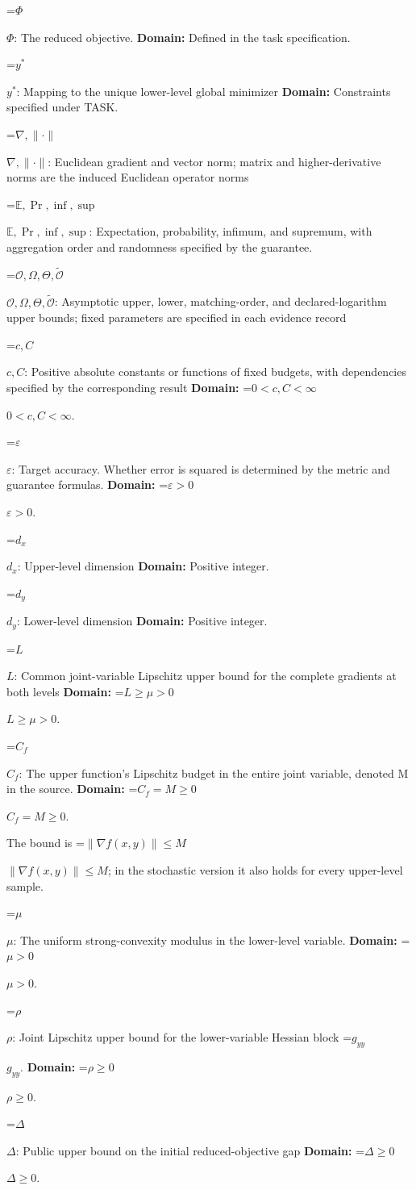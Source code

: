 \documentclass[10pt,a4paper]{article}
\newcommand{\AtlasMath}[1]{\par\begingroup\centering\setbox0=\hbox{$\displaystyle #1$}\ifdim\wd0>1.4\linewidth\typeout{ATLAS WIDE FORMULA: \the\wd0}\fi\ifdim\wd0>\linewidth\resizebox{\linewidth}{!}{\box0}\else\box0\fi\par\endgroup}
\newcommand{\AtlasInlineMath}[1]{\begingroup\setbox0=\hbox{$#1$}\ifdim\wd0>.4\linewidth\endgroup\AtlasMath{#1}\else\endgroup$#1$\fi}
\begin{document}
\AtlasInlineMath{\Phi}: The reduced objective. \textbf{Domain:} Defined in the task specification.

\AtlasInlineMath{y^*}: Mapping to the unique lower-level global minimizer \textbf{Domain:} Constraints specified under TASK.

\AtlasInlineMath{\nabla,\|\cdot\|}: Euclidean gradient and vector norm; matrix and higher-derivative norms are the induced Euclidean operator norms

\AtlasInlineMath{\mathbb E,\Pr,\inf,\sup}: Expectation, probability, infimum, and supremum, with aggregation order and randomness specified by the guarantee.

\AtlasInlineMath{\mathcal O,\Omega,\Theta,\widetilde{\mathcal O}}: Asymptotic upper, lower, matching-order, and declared-logarithm upper bounds; fixed parameters are specified in each evidence record

\AtlasInlineMath{c,C}: Positive absolute constants or functions of fixed budgets, with dependencies specified by the corresponding result \textbf{Domain:} \AtlasInlineMath{0<c,C<\infty}.

\AtlasInlineMath{\varepsilon}: Target accuracy. Whether error is squared is determined by the metric and guarantee formulas. \textbf{Domain:} \AtlasInlineMath{\varepsilon>0}.

\AtlasInlineMath{d_x}: Upper-level dimension \textbf{Domain:} Positive integer.

\AtlasInlineMath{d_y}: Lower-level dimension \textbf{Domain:} Positive integer.

\AtlasInlineMath{L}: Common joint-variable Lipschitz upper bound for the complete gradients at both levels \textbf{Domain:} \AtlasInlineMath{L\ge\mu>0}.

\AtlasInlineMath{C_f}: The upper function’s Lipschitz budget in the entire joint variable, denoted M in the source. \textbf{Domain:} \AtlasInlineMath{C_f=M\ge0}.

The bound is \AtlasInlineMath{\|\nabla f(x,y)\|\le M}; in the stochastic version it also holds for every upper-level sample.

\AtlasInlineMath{\mu}: The uniform strong-convexity modulus in the lower-level variable. \textbf{Domain:} \AtlasInlineMath{\mu>0}.

\AtlasInlineMath{\rho}: Joint Lipschitz upper bound for the lower-variable Hessian block \AtlasInlineMath{g_{yy}}. \textbf{Domain:} \AtlasInlineMath{\rho\ge0}.

\AtlasInlineMath{\Delta}: Public upper bound on the initial reduced-objective gap \textbf{Domain:} \AtlasInlineMath{\Delta\ge0}.
\end{document}
